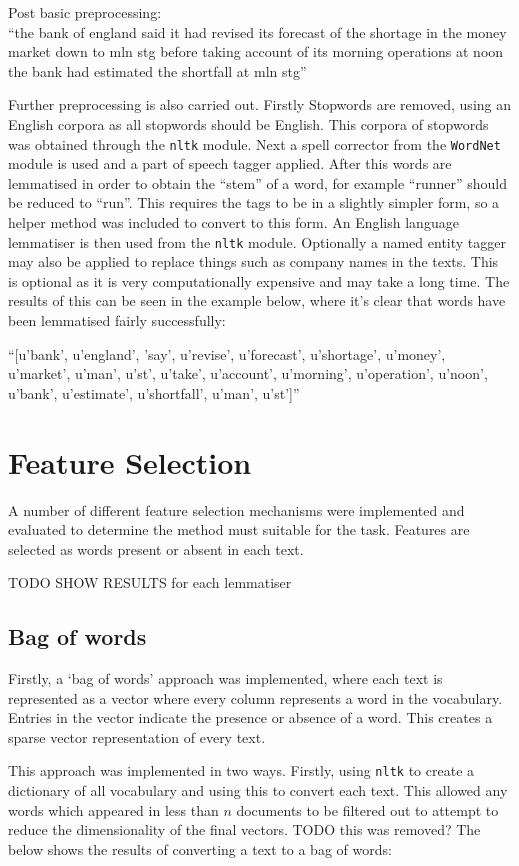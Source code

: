 \documentclass{article}
\begin{document}
Post basic preprocessing:
\\``the bank of england said it had revised its forecast of the shortage in the money market down to mln stg before taking account of its morning operations at noon the bank had estimated the shortfall at mln stg''

Further preprocessing is also carried out. Firstly Stopwords are removed, using an English corpora as all stopwords should be English. This corpora of stopwords was obtained through the \verb|nltk| module. Next a spell corrector from the \verb|WordNet| module is used and a part of speech tagger applied. After this words are lemmatised in order to obtain the ``stem'' of a word, for example ``runner'' should be reduced to ``run''. This requires the tags to be in a slightly simpler form, so a helper method was included to convert to this form. An English language lemmatiser is then used from the \verb|nltk| module. Optionally a named entity tagger may also be applied to replace things such as company names in the texts. This is optional as it is very computationally expensive and may take a long time. The results of this can be seen in the example below, where it's clear that words have been lemmatised fairly successfully:

``[u'bank', u'england', 'say', u'revise', u'forecast', u'shortage', u'money', u'market', u'man', u'st', u'take', u'account', u'morning', u'operation', u'noon', u'bank', u'estimate', u'shortfall', u'man', u'st']''

\section{Feature Selection}
A number of different feature selection mechanisms were implemented and evaluated to determine the method must suitable for the task. Features are selected as words present or absent in each text.

TODO SHOW RESULTS for each lemmatiser

\subsection{Bag of words}
Firstly, a `bag of words' approach was implemented, where each text is represented as a vector where every column represents a word in the vocabulary. Entries in the vector indicate the presence or absence of a word. This creates a sparse vector representation of every text.

This approach was implemented in two ways. Firstly, using \verb|nltk| to create a dictionary of all vocabulary and using this to convert each text. This allowed any words which appeared in less than $n$ documents to be filtered out to attempt to reduce the dimensionality of the final vectors. TODO this was removed? The below shows the results of converting a text to a bag of words:
\end{document}
